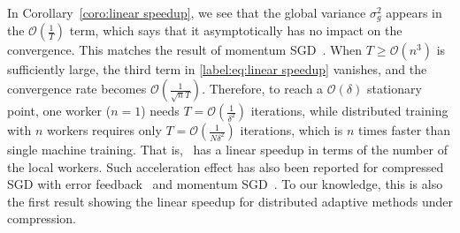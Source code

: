 \documentclass[11pt]{article}
\begin{document}
In Corollary~\ref{coro:linear speedup}, we see that the global variance $\sigma_g^2$ appears in the $\mathcal O(\frac{1}{T})$ term, which says that it asymptotically has no impact on the convergence. This matches the result of momentum SGD~\cite{Proc:Yu_ICML19}. When $T\geq \mathcal O(n^3)$ is sufficiently large, the third term in \eqref{label:eq:linear speedup} vanishes, and the convergence rate becomes $\mathcal O(\frac{1}{\sqrt nT})$. Therefore, to reach a $\mathcal O(\delta)$ stationary point, one worker ($n=1$) needs $T=\mathcal O(\frac{1}{\delta^2})$ iterations, while distributed training with $n$ workers requires only $T=\mathcal O(\frac{1}{N\delta^2})$ iterations, which is $n$ times faster than single machine training. That is, \algo\ has a linear speedup in terms of the number of the local workers. Such acceleration effect has also been reported for compressed SGD with error feedback~\cite{Proc:Zheng_NIPS19,jiang2018linear} and momentum SGD~\cite{Proc:Yu_ICML19}. To our knowledge, this is also the first result showing the linear speedup for distributed adaptive methods under compression.






\end{document}
